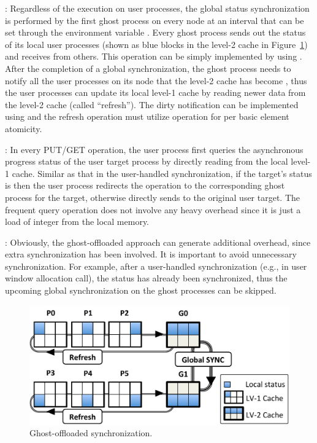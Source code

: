 :
Regardless of the execution on user processes, the global status
synchronization is performed by the first ghost process on every node
at an interval that can be set through the environment variable
. Every ghost process sends out the status of its
local user processes (shown as blue blocks in the level-2 cache in
Figure~\ref{fig:deg-adpt-gsync}) and receives from others.
This operation can be simply implemented by using .
After the completion of a global synchronization, the ghost process needs
to notify all the user processes on its node that the level-2 cache has
become , thus the user processes can update its local level-1
cache by reading newer data from the level-2 cache (called ``refresh'').
The dirty notification can be implemented using  and
the refresh operation must utilize  operation for
per basic element atomicity.

:
In every PUT/GET operation, the user process first queries
the asynchronous progress status of the user target process by directly
reading from the local level-1 cache. Similar as that in the user-handled
synchronization, if the target's status is  then the user process
redirects the operation to the corresponding ghost process for the target,
otherwise directly sends to the original user target. The frequent query
operation does not involve any heavy overhead since it is just a load of
integer from the local memory.

:
Obviously, the ghost-offloaded approach can generate additional overhead,
since extra synchronization has been involved. It is important to
avoid unnecessary synchronization. For example, after a user-handled
synchronization (e.g., in user window allocation call), the status has
already been synchronized, thus the upcoming global synchronization on
the ghost processes can be skipped.

\begin{figure}
\centering
\includegraphics[width=1\columnwidth]{figures/adpt-casper/design_adpt_gsync.pdf}
\caption{Ghost-offloaded synchronization.}
\label{fig:deg-adpt-gsync}
\end{figure}

